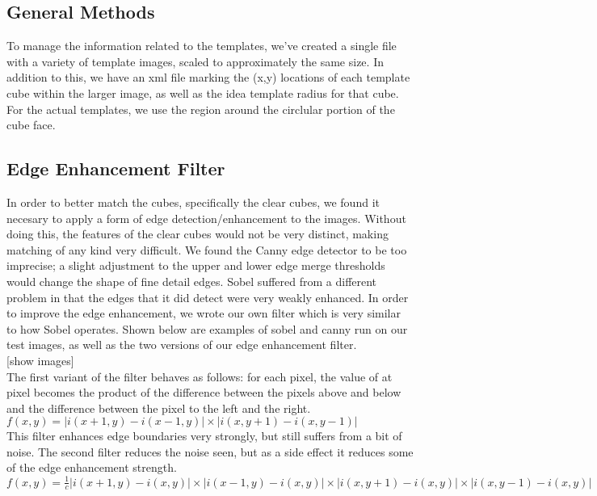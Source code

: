 \documentclass[conference]{IEEEtran}
\begin{document}
\subsection{General Methods}
To manage the information related to the templates, we've created a single file with a variety of template images, scaled to approximately the same size.  In addition to this, we have an xml file marking the (x,y) locations of each template cube within the larger image, as well as the idea template radius for that cube.  For the actual templates, we use the region around the circlular portion of the cube face.    

\subsection{Edge Enhancement Filter}
In order to better match the cubes, specifically the clear cubes, we found it necesary to apply a form of edge detection/enhancement to the images. Without doing this, the features of the clear cubes would not be very distinct, making matching of any kind very difficult.  We found the Canny edge detector to be too imprecise; a slight adjustment to the upper and lower edge merge thresholds would change the shape of fine detail edges. Sobel suffered from a different problem in that the edges that it did detect were very weakly enhanced.  In order to improve the edge enhancement, we  wrote our own filter which is very similar to how Sobel operates.  Shown below are examples of sobel and canny run on our test images, as well as the two versions of our edge enhancement filter.  
\\[6pt]
[show images] 
\\[6pt]
The first variant of the filter behaves as follows: for each pixel, the value of at pixel becomes the product of the difference between the pixels above and below and the difference between the pixel to the left and the right.
\\[6pt]
\begin{math} 
	f(x,y) = |i(x+1,y) - i(x-1,y)|  \times |i(x,y+1) - i(x,y-1)| 
\end{math} 
\\[6pt]
This filter enhances edge boundaries very strongly, but still suffers from a bit of noise. The second filter reduces the noise seen, but as a side effect it reduces some of the edge enhancement strength. 
\\[6pt]
\begin{math} 
	f(x,y) = \frac{1}{c} |i(x+1,y) - i(x,y)|  \times |i(x-1,y) - i(x,y)| \times |i(x,y+1) - i(x,y)| \times |i(x,y-1) - i(x,y)| 
\end{math} 
\\[6pt]
\end{document}
